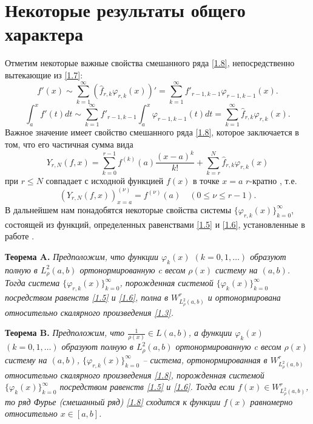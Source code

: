 \section{Некоторые результаты общего характера }

Отметим некоторые важные свойства смешанного ряда \eqref{1.8}, непосредственно вытекающие из \eqref{1.7}:
\begin{equation}\label{2.1}
f'(x)\sim \sum_{k=1}^\infty (\hat f_{r,k}\varphi_{r,k}(x))'= \sum_{k=1}^\infty f'_{r-1,k-1}\varphi_{r-1,k-1}(x).
\end{equation}
\begin{equation}\label{2.2}
\int_a^xf'(t)dt\sim \sum_{k=1}^\infty f'_{r-1,k-1}\int_a^x\varphi_{r-1,k-1}(t)dt=\sum_{k=1}^\infty \hat f_{r,k}\varphi_{r,k}(x).
\end{equation}
Важное значение имеет свойство  смешанного ряда \eqref{1.8}, которое заключается в том, что его частичная сумма вида
\begin{equation}\label{2.3}
Y_{r,N}(f,x)=\sum_{k=0}^{r-1} f^{(k)}(a)\frac{(x-a)^k}{k!}+ \sum_{k=r}^{N} \hat f_{r,k}\varphi_{r,k}(x)
\end{equation}
 при   $r\le N$  совпадает с исходной функцией $f(x)$   в точке $x=a$ $r$-кратно , т.е.
\begin{equation}\label{2.4}
(Y_{r,N}(f,x))^{(\nu)}_{x=a}=f^{(\nu)}(a)\quad (0\le\nu\le r-1).
\end{equation}
 В дальнейшем нам понадобятся  некоторые  свойства системы $\{\varphi_{r,k}(x)\}_{k=0}^\infty$, состоящей из функций, определенных равенствами   \eqref{1.5} и \eqref{1.6}, установленные в работе \cite{Shar20}.

 \textbf{ Теорема A.} \textit{  Предположим, что    функции $\varphi_k(x)$ $(k=0,1,\ldots)$ образуют полную в $L^2_\rho(a,b)$ ортонормированную   c весом   $\rho(x)$ систему на  $(a,b)$. Тогда система $\{\varphi_{r,k}(x)\}_{k=0}^\infty$, порожденная системой $\{\varphi_{k}(x)\}_{k=0}^\infty$ посредством равенств \eqref{1.5} и \eqref{1.6}, полна  в $W^r_{L^2_\rho(a,b)}$ и ортонормирована относительно скалярного произведения \eqref{1.3}.}


\textbf{ Теорема B.} \textit{
Предположим, что  $ \frac{1}{\rho(x)}\in L(a,b) $, а  функции $\varphi_k(x)$ $(k=0,1,\ldots)$  образуют полную в $L^2_\rho(a,b)$ ортонормированную   c весом   $\rho(x)$ систему на $(a,b)$, $\{\varphi_{r,k}(x)\}_{k=0}^\infty$ -- система, ортонормированная в $W^r_{L^2_\rho(a,b)}$ относительно скалярного произведения \eqref{1.8},  порожденная системой $\{\varphi_{k}(x)\}_{k=0}^\infty$ посредством равенств \eqref{1.5} и \eqref{1.6}.
Тогда если $f(x)\in W^r_{L^2_\rho(a,b)}$, то ряд Фурье (смешанный ряд) \eqref{1.8} сходится к функции $f(x)$ равномерно относительно $x\in[a,b]$.}

